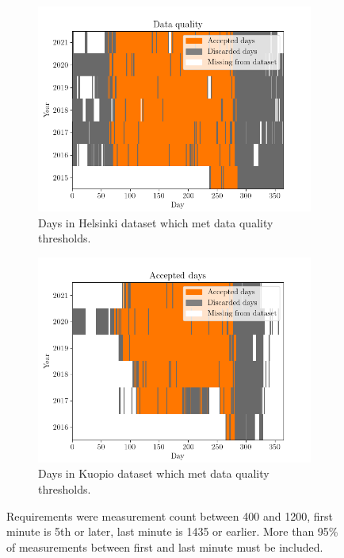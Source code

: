 \begin{figure}[h]
	
     \centering
     \begin{subfigure}[b]{0.48\textwidth}
         \centering
         \includegraphics[width=\textwidth]{pics/helsinki_accepted_days}
         \caption{Days in Helsinki dataset which met data quality thresholds.}
         \label{fig_helsinki_accepted}
     \end{subfigure}
     \hfill
     \begin{subfigure}[b]{0.48\textwidth}
         \centering
         \includegraphics[width=\textwidth]{pics/kuopio_accepted_days}
         \caption{Days in Kuopio dataset which met data quality thresholds.}
         
         \label{fig_kuopio_accepted}
     \end{subfigure}
     \hfill
     \caption{Requirements were measurement count between 400 and 1200, first minute is 5th or later, last minute is 1435 or earlier. More than 95\% of measurements between first and last minute must be included.}
     \label{fig_accepted_days}
     
\end{figure}



